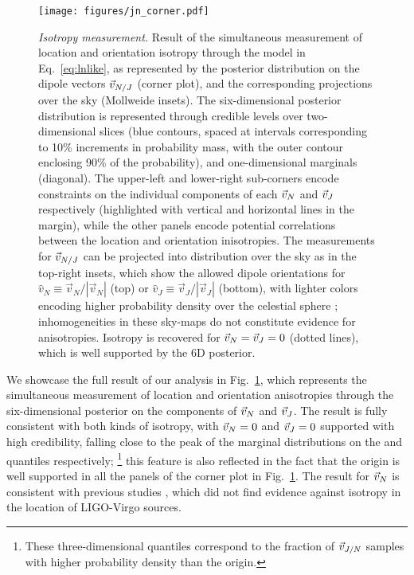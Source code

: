 \documentclass[aps,prd,twocolumn,superscriptaddress,preprintnumbers,floatfix,nofootinbib]{revtex4-2}
\newcommand{\clJ}{}
\newcommand{\clN}{}
\begin{document}
\begin{figure*}[p]
\texttt{[image: figures/jn\_corner.pdf]}
\caption{\emph{Isotropy measurement.} Result of the simultaneous measurement of location and orientation isotropy through the model in Eq.~\eqref{eq:lnlike}, as represented by the posterior distribution on the dipole vectors $\vec{v}_{N/J}$ (corner plot), and the corresponding projections over the sky (Mollweide insets).
The six-dimensional posterior distribution is represented through credible levels over two-dimensional slices (blue contours, spaced at intervals corresponding to 10\% increments in probability mass, with the outer contour enclosing 90\% of the probability), and one-dimensional marginals (diagonal).
The upper-left and lower-right sub-corners encode constraints on the individual components of each $\vec{v}_{N}$ and $\vec{v}_{J}$ respectively (highlighted with vertical and horizontal lines in the margin), while the other panels encode potential correlations between the location and orientation inisotropies.
The measurements for $\vec{v}_{N/J}$ can be projected into distribution over the sky as in the top-right insets, which show the allowed dipole orientations for $\hat{v}_N \equiv \vec{v}_N / |\vec{v}_N|$ (top) or $\hat{v}_J \equiv \vec{v}_J / |\vec{v}_J|$ (bottom), with lighter colors encoding higher probability density over the celestial sphere \cite{skymap,Singer:2016eax,Singer:2016erz}; inhomogeneities in these sky-maps do not constitute evidence for anisotropies.
Isotropy is recovered for $\vec{v}_{N} = \vec{v}_{J} = 0$ (dotted lines), which is well supported by the 6D posterior.
}
\label{fig:jn_corner}
\end{figure*}

We showcase the full result of our analysis in Fig.~\ref{fig:jn_corner}, which represents the simultaneous measurement of location and orientation anisotropies through the six-dimensional posterior on the components of $\vec{v}_{N}$ and $\vec{v}_{J}$.
The result is fully consistent with both kinds of isotropy, with $\vec{v}_{N} = 0$ and $\vec{v}_{J} = 0$ supported with high credibility, falling close to the peak of the marginal distributions on the \clN and \clJ quantiles respectively;%
\footnote{These three-dimensional quantiles correspond to the fraction of $\vec{v}_{J/N}$ samples with higher probability density than the origin.}
 this feature is also reflected in the fact that the origin is well supported in all the panels of the corner plot in Fig.~\ref{fig:jn_corner}.
The result for $\vec{v}_{N}$ is consistent with previous studies \cite{Essick:2022slj}, which did not find evidence against isotropy in the location of LIGO-Virgo sources.
\end{document}
